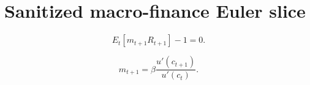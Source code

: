 \section{Sanitized macro-finance Euler slice}

\begin{equation}\label{eq:dept-euler-equation}
E_t[m_{t+1} R_{t+1}] - 1 = 0.
\end{equation}

\begin{equation}\label{eq:dept-sdf}
m_{t+1} = \beta \frac{u'(c_{t+1})}{u'(c_t)}.
\end{equation}
